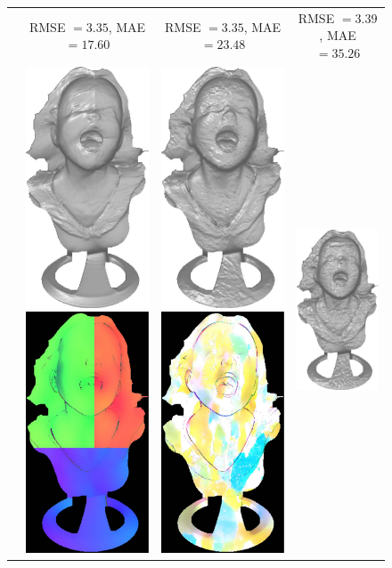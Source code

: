 \begin{figure}[H]
{\begin{tabular}{cccc}
& {\small RMSE $= 3.35$, MAE $=17.60$} & {\small RMSE $= 3.35$, MAE $=23.48$} & {\small RMSE $= 3.39$, MAE $=35.26$} \\
\multirow{-15}{*}{\parbox[t]{2.5mm}{}}&
 \includegraphics[height=0.25\linewidth]{figures/result/comp_fusion_rgb_shape.pdf}
 \includegraphics[height=0.25\linewidth]{figures/result/comp_fusion_rgb_albedo.pdf} &
 \includegraphics[height=0.25\linewidth]{figures/result/comp_fusion_pattern_shape.pdf} 
\includegraphics[height=0.25\linewidth]{figures/result/comp_fusion_pattern_albedo.pdf} &
\includegraphics[height=0.25\linewidth]{figures/result/comp_fusion_love_shape.pdf} 

\end{tabular}}
\end{figure}
